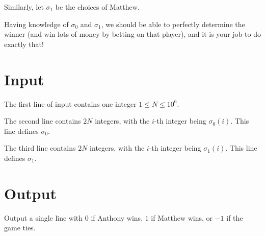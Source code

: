 Similarly, let $\sigma_1$ be the choices of Matthew.

Having knowledge of $\sigma_0$ and $\sigma_1$, we should be able to perfectly determine the winner (and win lots of money by betting on that player), and it is your job to do exactly that!

\section*{Input}

The first line of input contains one integer $1\leq N\leq 10^6$.

The second line contains $2N$ integers, with the $i$-th integer being $\sigma_0(i)$. This line defines $\sigma_0$.

The third line contains $2N$ integers, with the $i$-th integer being $\sigma_1(i)$. This line defines $\sigma_1$.

\section*{Output}

Output a single line with $0$ if Anthony wins, $1$ if Matthew wins, or $-1$ if the game ties.
